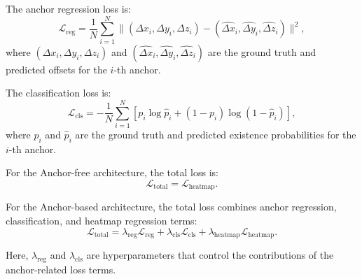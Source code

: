 The anchor regression loss is:
\begin{equation}
\mathcal{L}_{\text{reg}} = \frac{1}{N} \sum_{i=1}^N \| (\Delta x_i, \Delta y_i, \Delta z_i) - (\hat{\Delta x}_i, \hat{\Delta y}_i, \hat{\Delta z}_i) \|^2,
\end{equation}
where \( (\Delta x_i, \Delta y_i, \Delta z_i) \) and \( (\hat{\Delta x}_i, \hat{\Delta y}_i, \hat{\Delta z}_i) \) are the ground truth and predicted offsets for the \( i \)-th anchor.

The classification loss is:
\begin{equation}
\mathcal{L}_{\text{cls}} = - \frac{1}{N} \sum_{i=1}^N \left[ p_i \log \hat{p}_i + (1 - p_i) \log (1 - \hat{p}_i) \right],
\end{equation}
where \( p_i \) and \( \hat{p}_i \) are the ground truth and predicted existence probabilities for the \( i \)-th anchor.

For the Anchor-free architecture, the total loss is:
\begin{equation}
\mathcal{L}_{\text{total}} = \mathcal{L}_{\text{heatmap}}.
\end{equation}

For the Anchor-based architecture, the total loss combines anchor regression, classification, and heatmap regression terms:
\begin{equation}
\mathcal{L}_{\text{total}} = \lambda_{\text{reg}} \mathcal{L}_{\text{reg}} + \lambda_{\text{cls}} \mathcal{L}_{\text{cls}} + \lambda_{\text{heatmap}} \mathcal{L}_{\text{heatmap}}.
\end{equation}

Here, \( \lambda_{\text{reg}} \) and \( \lambda_{\text{cls}} \) are hyperparameters that control the contributions of the anchor-related loss terms.
